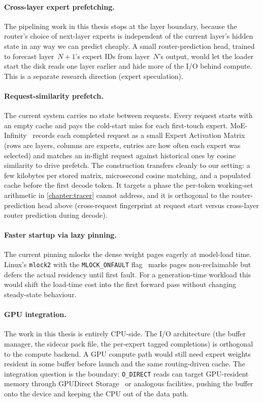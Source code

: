 \paragraph{Cross-layer expert prefetching.}
The pipelining work in this thesis stops at the layer boundary, because the router's choice of next-layer experts is independent of the current layer's hidden state in any way we can predict cheaply.
A small router-prediction head, trained to forecast layer~$N{+}1$'s expert IDs from layer~$N$'s output, would let the loader start the disk reads one layer earlier and hide more of the I/O behind compute.
This is a separate research direction (expert speculation).

\paragraph{Request-similarity prefetch.}
The current system carries no state between requests.
Every request starts with an empty cache and pays the cold-start miss for each first-touch expert.
MoE-Infinity~\cite{xue2024moeinfinity} records each completed request as a small Expert Activation Matrix (rows are layers, columns are experts, entries are how often each expert was selected) and matches an in-flight request against historical ones by cosine similarity to drive prefetch.
The construction transfers cleanly to our setting: a few kilobytes per stored matrix, microsecond cosine matching, and a populated cache before the first decode token.
It targets a phase the per-token working-set arithmetic in \autoref{chapter:tracer} cannot address, and it is orthogonal to the router-prediction head above (cross-request fingerprint at request start versus cross-layer router prediction during decode).

\paragraph{Faster startup via lazy pinning.}
The current pinning mlocks the dense weight pages eagerly at model-load time.
Linux's \texttt{mlock2} with the \texttt{MLOCK\_ONFAULT} flag~\cite{mlock2_man} marks pages non-reclaimable but defers the actual residency until first fault.
For a generation-time workload this would shift the load-time cost into the first forward pass without changing steady-state behaviour.

\paragraph{GPU integration.}
The work in this thesis is entirely CPU-side.
The I/O architecture (the buffer manager, the sidecar pack file, the per-expert tagged completions) is orthogonal to the compute backend.
A GPU compute path would still need expert weights resident in some buffer before launch and the same routing-driven cache.
The integration question is the boundary: \texttt{O\_DIRECT} reads can target GPU-resident memory through GPUDirect Storage~\cite{nvidia_gds} or analogous facilities, pushing the buffer onto the device and keeping the CPU out of the data path.

